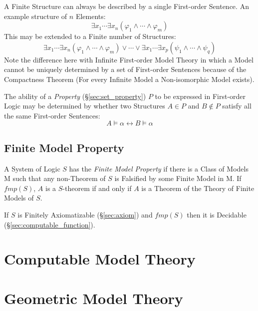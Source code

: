 A Finite Structure can always be described by a single First-order
Sentence. An example structure of $n$ Elements:
\[
    \exists x_1 \cdots \exists x_n ( \varphi_1 \wedge \cdots \wedge
    \varphi_m )
\]
This may be extended to a Finite number of Structures:
\[
    \exists x_1 \cdots \exists x_n ( \varphi_1 \wedge \cdots \wedge
    \varphi_m )
    \vee
    \cdots
    \vee
    \exists x_1 \cdots \exists x_p ( \psi_1 \wedge \cdots \wedge
    \psi_q )
\]
Note the difference here with Infinite First-order Model Theory in
which a Model cannot be uniquely determined by a set of First-order
Sentences because of the Compactness Theorem (For every Infinite Model
a Non-isomorphic Model exists).

The ability of a \emph{Property} (\S\ref{sec:set_property}) $P$ to
be expressed in First-order Logic may be determined by whether two
Structures $A \in P$ and $B \notin P$ satisfy all the same First-order
Sentences:
\[
    A \vDash \alpha \leftrightarrow B \vDash \alpha
\]



\subsection{Finite Model Property}

A System of Logic $S$ has the \emph{Finite Model Property} if there is
a Class of Models $\mathrm{M}$ such that any non-Theorem of $S$ is
Falsified by some Finite Model in $\mathrm{M}$. If $fmp(S)$, $A$ is a
$S$-theorem if and only if $A$ is a Theorem of the Theory of Finite
Models of $S$.

If $S$ is Finitely Axiomatizable (\S\ref{sec:axiom}) and $fmp(S)$ then
it is Decidable (\S\ref{sec:computable_function}).



\section{Computable Model Theory}\label{sec:computable_model_theory}

\cite{harizanov98}



\section{Geometric Model Theory}

